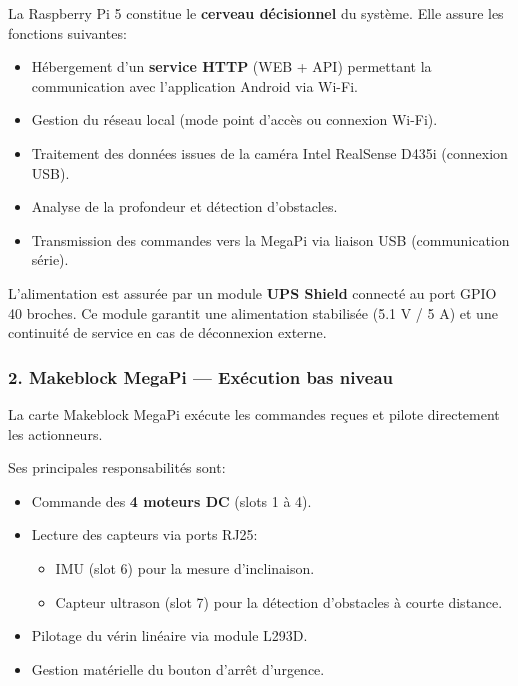 \documentclass[12pt,a4paper]{article}
\begin{document}
La Raspberry Pi 5 constitue le \textbf{cerveau décisionnel} du système.
Elle assure les fonctions suivantes:

\begin{itemize}
    \item Hébergement d’un \textbf{service HTTP} (WEB + API) permettant la communication avec l’application Android via Wi-Fi.
    \item Gestion du réseau local (mode point d’accès ou connexion Wi-Fi).
    \item Traitement des données issues de la caméra Intel RealSense D435i (connexion USB).
    \item Analyse de la profondeur et détection d’obstacles.
    \item Transmission des commandes vers la MegaPi via liaison USB (communication série).
\end{itemize}

L’alimentation est assurée par un module \textbf{UPS Shield}
connecté au port GPIO 40 broches.
Ce module garantit une alimentation stabilisée (5.1 V / 5 A)
et une continuité de service en cas de déconnexion externe.

\subsubsection*{2. Makeblock MegaPi — Exécution bas niveau}

La carte Makeblock MegaPi exécute les commandes reçues
et pilote directement les actionneurs.

Ses principales responsabilités sont:

\begin{itemize}
    \item Commande des \textbf{4 moteurs DC} (slots 1 à 4).
    \item Lecture des capteurs via ports RJ25:
    \begin{itemize}
        \item IMU (slot 6) pour la mesure d’inclinaison.
        \item Capteur ultrason (slot 7) pour la détection d’obstacles à courte distance.
    \end{itemize}
    \item Pilotage du vérin linéaire via module L293D.
    \item Gestion matérielle du bouton d’arrêt d’urgence.
\end{itemize}
\end{document}
